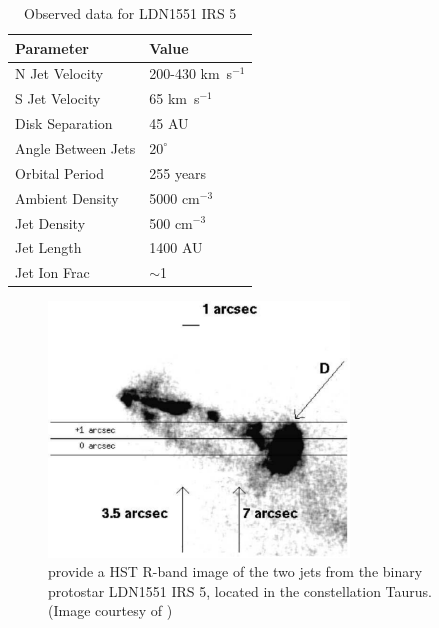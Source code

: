 \begin{table}
\begin{center}
\begin{tabular}{|l| l|}
\hline
Parameter & Value \\
\hline
N Jet Velocity & 200-430 km~s$^{-1}$   \\
S Jet Velocity & 65 km~s$^{-1}$ \\
Disk Separation & 45 AU \\
Angle Between Jets & $20^{\circ}$ \\
Orbital Period & 255 years \\
Ambient Density & 5000 cm$^{-3}$ \\
Jet Density & 500 cm$^{-3}$ \\
Jet Length & 1400 AU \\
Jet Ion Frac & $\sim$1 \\
\hline
\end{tabular}
\caption{Observed data for LDN1551 IRS 5}
\end{center}
\label{ObservationTable}
\end{table}




\begin{figure}[t]
\centering
\includegraphics[width=8cm]{l1551_small}
\caption{
\citet{1998ApJ...499L..75F} provide a HST R-band image of the two jets from the
binary protostar LDN1551 IRS 5, located in the constellation Taurus.  (Image courtesy of \citet{1998ApJ...499L..75F}) }
\label{fig:4-1} 
\end{figure}


